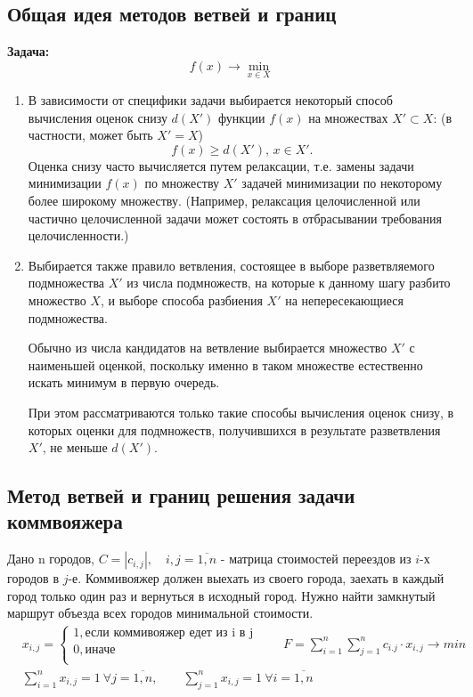 \documentclass[17pt]{extarticle}
\begin{document}
\subsection{Общая идея методов ветвей и границ}
\textbf{Задача:}
\[
    f(x) \rightarrow \min_{x \in X}
\]
\begin{enumerate}
    \item В зависимости от специфики задачи выбирается некоторый способ вычисления оценок снизу \( d(X') \) функции \( f(x) \) на множествах \( X' \subset X \):
          (в частности, может быть \( X' = X \))
          \[
              f(x) \geq d(X'), \, x \in X'.
          \]
          Оценка снизу часто вычисляется путем релаксации,
          т.е. замены задачи минимизации \( f(x) \) по множеству \( X' \) задачей минимизации по некоторому более широкому множеству.
          (Например, релаксация целочисленной или частично целочисленной задачи может состоять в отбрасывании требования целочисленности.)

    \item Выбирается также правило ветвления, состоящее в выборе разветвляемого подмножества \( X' \) из числа подмножеств,
          на которые к данному шагу разбито множество \( X \), и выборе способа разбиения \( X' \) на непересекающиеся подмножества.

          Обычно из числа кандидатов на ветвление выбирается множество \( X' \) с наименьшей оценкой,
          поскольку именно в таком множестве естественно искать минимум в первую очередь.

          При этом рассматриваются только такие способы вычисления оценок снизу, в которых оценки для подмножеств,
          получившихся в результате разветвления \( X' \), не меньше \( d(X') \).
\end{enumerate}
\subsection*{Метод ветвей и границ решения задачи коммвояжера}
Дано n городов, $C = \left| c_{i,j} \right|, \quad i, j = \overline{1, n}$ - матрица стоимостей переездов из $i$-х городов в $j$-е.
Коммивояжер должен выехать из своего города, заехать в каждый город только один раз и вернуться в исходный город.
Нужно найти замкнутый маршрут объезда всех городов минимальной стоимости.
\[
    \begin{aligned}
         & x_{i,j} = \begin{cases} 1, \text{если коммивояжер едет из i в j} \\ 0, \text{иначе} \\ \end{cases}
        \qquad F=\sum_{i=1}^n \sum_{j=1}^n c_{i.j} \cdot x_{i,j} \rightarrow min                              \\
         & \sum_{i=1}^n x_{i,j} = 1 \ \forall j=\overline{1,n}, \qquad
        \sum_{j=1}^n x_{i,j} = 1 \ \forall i=\overline{1,n}                                                   \\
    \end{aligned}
\]
\end{document}
